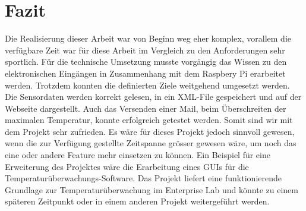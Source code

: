 \section{Fazit}
Die Realisierung dieser Arbeit war von Beginn weg eher komplex, vorallem die verfügbare Zeit war für diese Arbeit im Vergleich zu den Anforderungen sehr sportlich. Für die technische Umsetzung musste vorgängig das Wissen zu den elektronischen Eingängen in Zusammenhang mit dem Raspbery Pi erarbeitet werden. Trotzdem konnten die definierten Ziele weitgehend umgesetzt werden. Die Sensordaten werden korrekt gelesen, in ein XML-File gespeichert und auf der Webseite dargestellt. Auch das Versenden einer Mail, beim Überschreiten der maximalen Temperatur, konnte erfolgreich getestet werden. Somit sind wir mit dem Projekt sehr zufrieden. Es wäre für dieses Projekt jedoch sinnvoll gewesen, wenn die zur Verfügung gestellte Zeitspanne grösser gewesen wäre, um noch das eine oder andere Feature mehr einsetzen zu können. Ein Beispiel für eine Erweiterung des Projektes wäre die Erarbeitung eines GUIs für die Temperaturüberwachungs-Software. Das Projekt liefert eine funktionierende Grundlage zur Temperaturüberwachung im Enterprise Lab und könnte zu einem späteren Zeitpunkt oder in einem anderen Projekt weitergeführt werden. 
\newpage